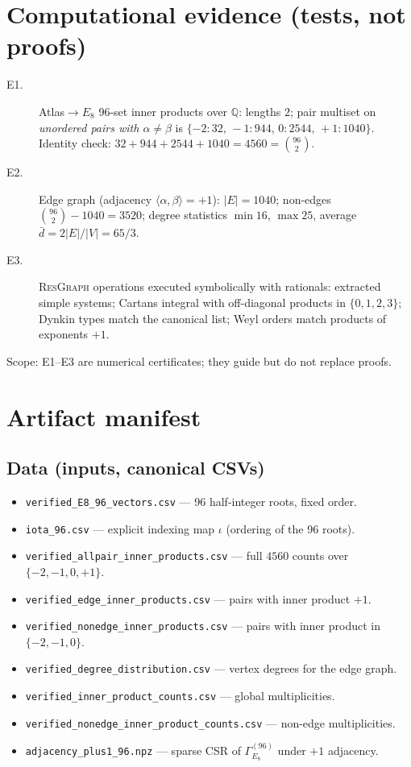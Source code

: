\documentclass[12pt]{article}
\begin{document}
\section{Computational evidence (tests, not proofs)}
\begin{description}
  \item[E1.] Atlas$\to E_8$ 96-set inner products over $\mathbb Q$: lengths $2$; pair multiset on \emph{unordered pairs with $\alpha\ne\beta$} is $\{-2{:}32,\,-1{:}944,\,0{:}2544,\,+1{:}1040\}$. Identity check: $32+944+2544+1040=4560=\binom{96}{2}$.
  \item[E2.] Edge graph (adjacency $\langle\alpha,\beta\rangle=+1$): $|E|=1040$; non-edges $\binom{96}{2}-1040=3520$; degree statistics $\min 16$, $\max 25$, average $\bar d=2|E|/|V|=65/3$.
  \item[E3.] \textsc{ResGraph} operations executed symbolically with rationals: extracted simple systems; Cartans integral with off-diagonal products in $\{0,1,2,3\}$; Dynkin types match the canonical list; Weyl orders match products of exponents $+1$.
\end{description}
Scope: E1--E3 are numerical certificates; they guide but do not replace proofs.

\section{Artifact manifest}
\subsection*{Data (inputs, canonical CSVs)}
\begin{itemize}\itemsep2pt
  \item \texttt{verified\_E8\_96\_vectors.csv} --- 96 half-integer roots, fixed order.
  \item \texttt{iota\_96.csv} --- explicit indexing map $\iota$ (ordering of the 96 roots).
  \item \texttt{verified\_allpair\_inner\_products.csv} --- full $4560$ counts over $\{-2,-1,0,+1\}$.
  \item \texttt{verified\_edge\_inner\_products.csv} --- pairs with inner product $+1$.
  \item \texttt{verified\_nonedge\_inner\_products.csv} --- pairs with inner product in $\{-2,-1,0\}$.
  \item \texttt{verified\_degree\_distribution.csv} --- vertex degrees for the edge graph.
  \item \texttt{verified\_inner\_product\_counts.csv} --- global multiplicities.
  \item \texttt{verified\_nonedge\_inner\_product\_counts.csv} --- non-edge multiplicities.
  \item \texttt{adjacency\_plus1\_96.npz} --- sparse CSR of $\Gamma_{E_8}^{(96)}$ under $+1$ adjacency.
\end{itemize}
\end{document}
